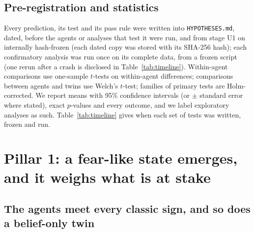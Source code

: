 \documentclass[11pt]{article}
\begin{document}
\subsection{Pre-registration and statistics}

Every prediction, its test and its pass rule were written into \texttt{HYPOTHESES.md}, dated, before the agents or analyses that test it were run, and from stage U1 on internally hash-frozen (each dated copy was stored with its SHA-256 hash); each confirmatory analysis was run once on its complete data, from a frozen script (one rerun after a crash is disclosed in Table~\ref{tab:timeline}). Within-agent comparisons use one-sample $t$-tests on within-agent differences; comparisons between agents and twins use Welch's $t$-test; families of primary tests are Holm-corrected. We report means with 95\% confidence intervals (or $\pm$ standard error where stated), exact $p$-values and every outcome, and we label exploratory analyses as such. Table~\ref{tab:timeline} gives when each set of tests was written, frozen and run.

\section{Pillar 1: a fear-like state emerges, and it weighs what is at stake}
\label{sec:p1}

\subsection{The agents meet every classic sign, and so does a belief-only twin}
\label{sec:classic}
\end{document}

